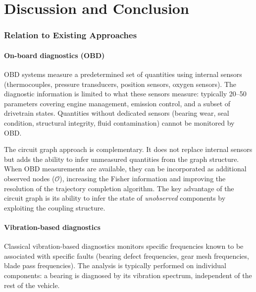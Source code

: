 \documentclass[twocolumn,10pt,a4paper]{article}
\theoremstyle{definition}
\theoremstyle{remark}
\begin{document}

\part{Discussion and Conclusion}

\section{Relation to Existing Approaches}\label{sec:comparison}

\subsection{On-board diagnostics (OBD)}

OBD systems \citep{SAEJ1979} measure a predetermined set of quantities using internal sensors (thermocouples, pressure transducers, position sensors, oxygen sensors). The diagnostic information is limited to what these sensors measure: typically 20--50 parameters covering engine management, emission control, and a subset of drivetrain states. Quantities without dedicated sensors (bearing wear, seal condition, structural integrity, fluid contamination) cannot be monitored by OBD.

The circuit graph approach is complementary. It does not replace internal sensors but adds the ability to infer unmeasured quantities from the graph structure. When OBD measurements are available, they can be incorporated as additional observed nodes ($\mathcal{O}$), increasing the Fisher information and improving the resolution of the trajectory completion algorithm. The key advantage of the circuit graph is its ability to infer the state of \emph{unobserved} components by exploiting the coupling structure.

\subsection{Vibration-based diagnostics}

Classical vibration-based diagnostics \citep{Randall2011, Henriquez2014, CervantesAlvarez2018} monitors specific frequencies known to be associated with specific faults (bearing defect frequencies, gear mesh frequencies, blade pass frequencies). The analysis is typically performed on individual components: a bearing is diagnosed by its vibration spectrum, independent of the rest of the vehicle.
\end{document}
